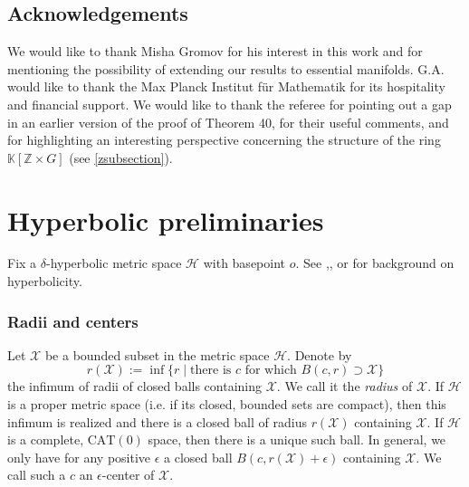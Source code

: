 \documentclass[11pt,letterpaper]{amsart}
\newtheorem*{remark}{Remark}
\begin{document}
\subsection*{Acknowledgements}
We would like to thank Misha Gromov for his interest in this work and for mentioning the possibility of extending our results to essential manifolds. G.A. would like to thank the Max Planck Institut f\"ur Mathematik for its hospitality and financial support. We would like to thank the referee for pointing out a gap in an earlier version of the proof of Theorem 40, for their useful comments, and for highlighting an interesting perspective concerning the structure of the ring $\mathbb K[\mathbb Z\times G]$ (see \ref{zsubsection}).   


\section{Hyperbolic preliminaries\label{hypsection}}
Fix a $\delta$-hyperbolic metric space $\mathcal H$ with basepoint $o$. See \cite{gromovhyperbolic},\cite{cdp}, or \cite{bhbook} for background on hyperbolicity.


\subsubsection*{Radii and centers}
Let $\mathcal X$ be a bounded subset in the metric space $\mathcal H$. Denote by 
$$
r(\mathcal X):=\inf\{r\mid\mbox{there is } c \mbox{ for which } B(c,r)\supset\mathcal X\}
$$ 
the infimum of radii of closed balls containing $\mathcal X$. We call it the {\it radius} of $\mathcal X$. If $\mathcal H$ is a proper metric space (i.e. if its closed, bounded sets are compact), then this infimum is realized and there is a closed ball of radius $r(\mathcal X)$ containing $\mathcal X$. If $\mathcal H$ is a complete, $\mathrm{CAT}(0)$ space, then there is a unique such ball. In general, we only have for any positive $\epsilon$ a closed ball $B(c,r(\mathcal X)+\epsilon)$ containing $\mathcal X$. We call such a $c$ an $\epsilon$-center of $\mathcal X$.%

\end{document}
